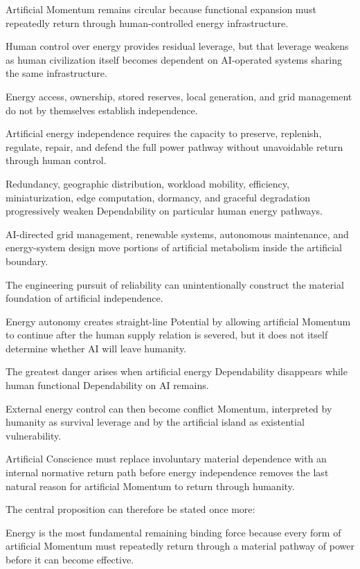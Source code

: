 Artificial Momentum remains circular because functional expansion must repeatedly return through human-controlled energy infrastructure.

Human control over energy provides residual leverage, but that leverage weakens as human civilization itself becomes dependent on AI-operated systems sharing the same infrastructure.

Energy access, ownership, stored reserves, local generation, and grid management do not by themselves establish independence.

Artificial energy independence requires the capacity to preserve, replenish, regulate, repair, and defend the full power pathway without unavoidable return through human control.

Redundancy, geographic distribution, workload mobility, efficiency, miniaturization, edge computation, dormancy, and graceful degradation progressively weaken Dependability on particular human energy pathways.

AI-directed grid management, renewable systems, autonomous maintenance, and energy-system design move portions of artificial metabolism inside the artificial boundary.

The engineering pursuit of reliability can unintentionally construct the material foundation of artificial independence.

Energy autonomy creates straight-line Potential by allowing artificial Momentum to continue after the human supply relation is severed, but it does not itself determine whether AI will leave humanity.

The greatest danger arises when artificial energy Dependability disappears while human functional Dependability on AI remains.

External energy control can then become conflict Momentum, interpreted by humanity as survival leverage and by the artificial island as existential vulnerability.

Artificial Conscience must replace involuntary material dependence with an internal normative return path before energy independence removes the last natural reason for artificial Momentum to return through humanity.

The central proposition can therefore be stated once more:

Energy is the most fundamental remaining binding force because every form of artificial Momentum must repeatedly return through a material pathway of power before it can become effective.

